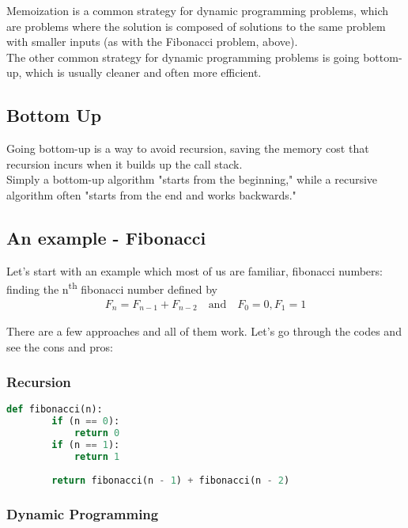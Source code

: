 \documentclass[12pt]{article}
\begin{document}
    Memoization is a common strategy for dynamic programming problems, which are problems where the solution is composed of solutions to the same problem with smaller inputs (as with the Fibonacci problem, above). \\The other common strategy for dynamic programming problems is going bottom-up, which is usually cleaner and often more efficient.
    	
	\subsection{Bottom Up}
	Going bottom-up is a way to avoid recursion, saving the memory cost that recursion incurs when it builds up the call stack.\\

    Simply a bottom-up algorithm "starts from the beginning," while a recursive algorithm often "starts from the end and works backwards."
	
	\subsection{An example - Fibonacci}
	Let's start with an example which most of us are familiar, fibonacci numbers: finding the n\textsuperscript{th} fibonacci number defined by\\
    \begin{align*}
    F_n = F_{n-1} + F_{n-2} \quad \textrm{and} \quad F_0 = 0,   F_1 = 1
    \end{align*}
    
    There are a few approaches and all of them work. Let's go through the codes and see the cons and pros:
	\subsubsection{Recursion}
	
    \begin{lstlisting}[language=Python]
    def fibonacci(n):
        if (n == 0):
            return 0
        if (n == 1):
            return 1
    
        return fibonacci(n - 1) + fibonacci(n - 2)
    \end{lstlisting}

	\subsubsection{Dynamic Programming}
        
\end{document}
